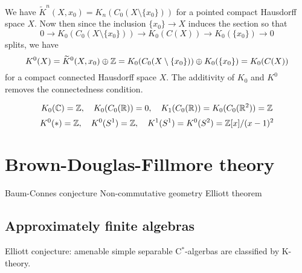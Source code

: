 \documentclass{../../large}
\begin{document}
We have $\tilde K^n(X,x_0)=K_n(C_0(X\setminus\{x_0\}))$ for a pointed compact Hausdorff space $X$.
Now then since the inclusion $\{x_0\}\to X$ induces the section so that
\[0\to K_0(C_0(X\setminus\{x_0\}))\to K_0(C(X))\to K_0(\{x_0\})\to0\]
splits, we have
\[K^0(X)=\widetilde K^0(X,x_0)\oplus\mathbb{Z}=K_0(C_0(X\setminus\{x_0\}))\oplus K_0(\{x_0\})=K_0(C(X))\]
for a compact connected Hausdorff space $X$.
The additivity of $K_0$ and $K^0$ removes the connectedness condition.

\[K_0(\mathbb{C})=\mathbb{Z},\quad K_0(C_0(\mathbb{R}))=0,\quad K_1(C_0(\mathbb{R}))=K_0(C_0(\mathbb{R}^2))=\mathbb{Z}\]
\[K^0(*)=\mathbb{Z},\quad K^0(S^1)=\mathbb{Z},\quad K^1(S^1)=K^0(S^2)=\mathbb{Z}[x]/(x-1)^2\]



\chapter{Brown-Douglas-Fillmore theory}
\begin{prb}
\end{prb}

Baum-Connes conjecture
Non-commutative geometry
Elliott theorem




\section{Approximately finite algebras}
Elliott conjecture: amenable simple separable C$^*$-algerbas are classified by K-theory.
\end{document}
